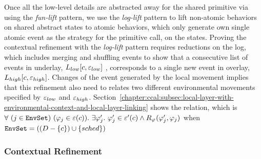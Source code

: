 Once all the low-level details are abstracted away for the shared primitive via using the \textit{fun-lift} pattern, we use the \textit{log-lift} pattern to lift non-atomic behaviors on shared abstract states to atomic behaviors, which only generate own single atomic event as the strategy for the primitive call, on the states. 
Proving the contextual refinement with the \textit{log-lift} pattern requires reductions on the log, 
which includes merging and shuffling events to show 
that a consecutive list of  events in underlay, $L_{low}[c, {\varepsilon}_{low}]$ , corresponds to a single new event in overlay, 
$L_{high}[c, {\varepsilon}_{high}]$.  Changes of the event generated by the local movement 
implies that this refinement also need to relates two different environmental movements specified by ${\varepsilon}_{low}$ and ${\varepsilon}_{high}$.
Section~\ref{chapter:ccal:subsec:local-layer-with-environmental-context-and-local-layer-linking} shows the relation,
which is $\forall\ (j \in \codeinmath{EnvSet})\ 
(\strat{j} \in \oracle(c)) .\ \exists \stratp{j} . \ \stratp{j} \in \oracle'(c) \wedge R_{\strat{}}(\stratp{j}, \strat{j})$ when 
${\mathrm{\texttt{EnvSet}}} = ((D - \{ c\}) \cup \{ sched\})$


\subsubsection{Contextual Refinement}

